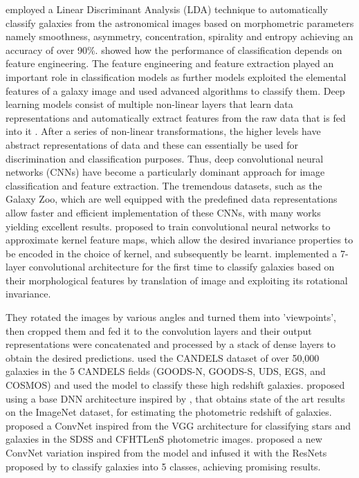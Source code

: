 \documentclass[fleqn,usenatbib]{mnras}
\begin{document}
\hspace*{0.25 in}\citet{Ferrari_2015} employed a Linear Discriminant Analysis (LDA) technique to automatically classify galaxies from the astronomical images based on morphometric parameters namely smoothness, asymmetry, concentration, spirality and entropy achieving an accuracy of over 90\%.
\citet{Lecun2015} showed how the performance of classification depends on feature engineering. The feature engineering and feature extraction played an important role in classification models as further models exploited the elemental features of a galaxy image and used advanced algorithms to classify them. Deep learning models consist of multiple non-linear layers that learn data representations and automatically extract features from the raw data that is fed into it \citep{Bengio2013,Lecun2015}. After a series of non-linear transformations, the higher levels have abstract representations of data and these can essentially be used for discrimination and classification purposes. Thus, deep convolutional neural networks (CNNs) have become a particularly dominant approach for image classification and feature extraction. The tremendous datasets, such as the Galaxy Zoo, which are well equipped with the predefined data representations allow faster and efficient implementation of these CNNs, with many works yielding excellent results. \citet{Mairal2014} proposed to train convolutional neural networks to approximate kernel feature maps, which allow the desired invariance properties to be encoded in the choice of kernel, and subsequently be learnt. \citet{Dieleman2015} implemented a 7-layer convolutional architecture for the first time to classify galaxies based on their morphological features by translation of image and exploiting its rotational invariance.

They rotated the images by various angles and turned them into 'viewpoints', then cropped them and fed it to the convolution layers and their output representations were concatenated and processed by a stack of dense layers to obtain the desired predictions. \citet{Huertas} used the CANDELS dataset of over 50,000 galaxies in the 5 CANDELS fields (GOODS-N, GOODS-S, UDS, EGS, and COSMOS) and used the \citep{Dieleman2015} model to classify these high redshift galaxies. \citet{HOYLE} proposed using a base DNN architecture inspired by \citep{Krizhevsky}, that obtains state of the art results on the ImageNet dataset, for estimating the photometric redshift of galaxies. \citet{brunner} proposed a ConvNet inspired from the VGG architecture for classifying stars and galaxies in the SDSS and CFHTLenS photometric images. \citet{dai2018galaxy} proposed a new ConvNet variation inspired from the \citet{Dieleman2015} model and infused it with the ResNets proposed by \citet{he2016} to classify galaxies into 5 classes, achieving promising results.
  
\end{document}
